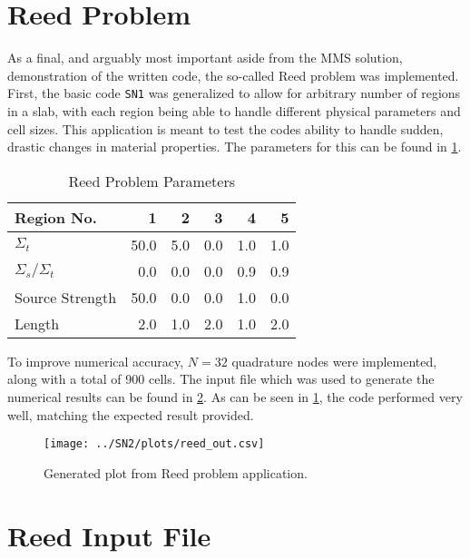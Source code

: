 \documentclass{NE515}
\theoremstyle{definition}
\begin{document}
    \section{Reed Problem}
    As a final, and arguably most important aside from the MMS solution, demonstration of the written code, the so-called Reed problem was implemented.
    First, the basic code \texttt{SN1} was generalized to allow for arbitrary number of regions in a slab, with each region being able to handle different physical parameters and cell sizes.
    This application is meant to test the codes ability to handle sudden, drastic changes in material properties.
    The parameters for this can be found in \cref{tab:reed-params}.
    \begin{table}
        \centering
        \begin{tabular}{lrrrrr}
            \toprule
            \textbf{Region No.}   & \textbf{1} & \textbf{2} & \textbf{3} & \textbf{4} & \textbf{5} \\
            \midrule
            $\Sigma_t$            & 50.0       & 5.0        & 0.0        & 1.0        & 1.0        \\
            $\Sigma_{s}/\Sigma_t$ & 0.0        & 0.0        & 0.0        & 0.9        & 0.9        \\
            Source Strength       & 50.0       & 0.0        & 0.0        & 1.0        & 0.0        \\
            Length                & 2.0        & 1.0        & 2.0        & 1.0        & 2.0        \\
            \bottomrule
        \end{tabular}
        \caption{Reed Problem Parameters}
        \label{tab:reed-params}
    \end{table}

    To improve numerical accuracy, $N=32$ quadrature nodes were implemented, along with a total of 900 cells.
    The input file which was used to generate the numerical results can be found in \cref{sec:reed-input-file}.
    As can be seen in \cref{fig:reed-figure}, the code performed very well, matching the expected result provided.


    \begin{figure}[!b]
        \centering
        \texttt{[image: ../SN2/plots/reed\_out.csv]}
        \caption{Generated plot from Reed problem application.}
        \label{fig:reed-figure}
    \end{figure}
    \clearpage


    \appendix


    \section{Reed Input File}\label{sec:reed-input-file}
    \inputminted[linenos, bgcolor=LightGray, fontsize=\footnotesize]{text}{../SN2/reed_input.txt}
    
    
\end{document}

